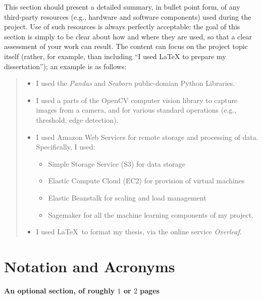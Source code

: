 \documentclass[ %
                    author={Daniel Page},
                supervisor={Dr. Andrew Calway},
                    degree={MSc},
                     title={Some Structural Guidelines for Data Science MSc Theses, Including Those With Long Titles that Run Across Multiple Lines on the Front Page},
                  subtitle={And those including an optional subtitle too, for good measure},
                      type={},
                      year={2021}]{dissertation}
\begin{document}
\noindent
This section should present a detailed summary, in bullet point form, 
of any third-party resources (e.g., hardware and software components) 
used during the project.  Use of such resources is always perfectly 
acceptable: the goal of this section is simply to be clear about how
and where they are used, so that a clear assessment of your work can
result.  The content can focus on the project topic itself (rather,
for example, than including ``I used \mbox{\LaTeX} to prepare my 
dissertation''); an example is as follows:

\begin{quote}
\noindent
\begin{itemize}

\item I used the {\em Pandas} and {\em Seaborn} public-domian Python Libraries. 

\item I used a parts of the OpenCV computer vision library to capture 
      images from a camera, and for various standard operations (e.g., 
      threshold, edge detection).

\item I used Amazon Web Services for remote storage and processing of data. Specifically, I used:
 \begin{itemize}
 \item Simple Storage Service (S3) for data storage
 \item Elastic Compute Cloud (EC2) for provision of virtual machines
 \item Elastic Beanstalk for scaling and load management
 \item Sagemaker for all the machine learning components of my project. 
 \end{itemize}
 
\item I used \LaTeX\ to format my thesis, via the online service {\em Overleaf}. 
\end{itemize}
\end{quote}


\chapter*{Notation and Acronyms}

{\bf An optional section, of roughly $1$ or $2$ pages}
\vspace{1cm} 
\end{document}
